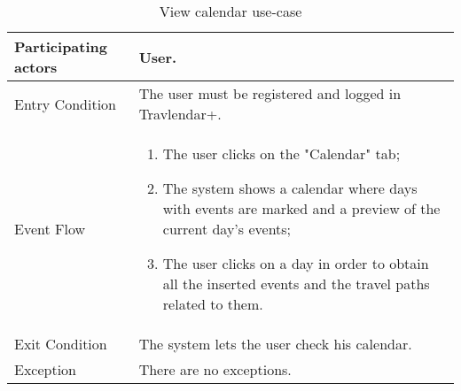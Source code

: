 \begin{table}[H]
	\begin{center}
		\begin{tabular}{ | p{} | p{} | }
		\hline
		Participating actors & User.\\
		\hline
		Entry Condition & The user must be registered and logged in Travlendar+.\\
		\hline
		Event Flow & 
			\begin{enumerate}
				\item The user clicks on the "Calendar" tab;
				\item The system shows a calendar where days with events are marked and a preview of the current day's events;
				\item The user clicks on a day in order to obtain all the inserted events and the travel paths related to them.
			\end{enumerate} \\
		\hline
		Exit Condition & The system lets the user check his calendar. \\
		\hline
		Exception & There are no exceptions.\\ 
		\hline
		\end{tabular}
	\end{center}
	\caption{View calendar use-case}
\end{table}